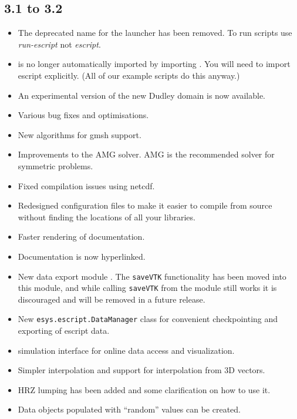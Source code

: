 \subsection*{3.1 to 3.2}
\begin{itemize}
\item The deprecated name for the launcher has been removed. To run scripts use
    \emph{run-escript} not \emph{escript}.
\item \escript is no longer automatically imported by importing \finley.
    You will need to import escript explicitly. (All of our example scripts do this anyway.)
\item An experimental version of the new Dudley domain is now available.
\item Various bug fixes and optimisations.
\item New algorithms for gmsh support.
\item Improvements to the AMG solver. AMG is the recommended solver for symmetric problems.
\item Fixed compilation issues using netcdf.
\item Redesigned configuration files to make it easier to compile from source
    without finding the locations of all your libraries.
\item Faster rendering of documentation.
\item Documentation is now hyperlinked.
\item New data export module \weipa. The \texttt{saveVTK} functionality has
    been moved into this module, and while calling \texttt{saveVTK} from the
    \escript module still works it is discouraged and will be removed in a
    future release.
\item New \texttt{esys.escript.DataManager} class for convenient checkpointing
    and exporting of escript data.
\item \VisIt simulation interface for online data access and visualization.
\item Simpler interpolation and support for interpolation from 3D vectors.
\item HRZ lumping has been added and some clarification on how to use it.
\item Data objects populated with ``random'' values can be created.
\end{itemize}

